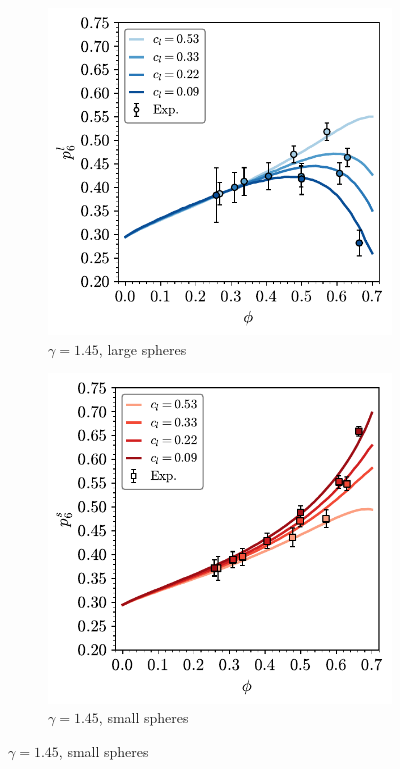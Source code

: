 \begin{figure}[bt]
     \vspace{2mm}
      \begin{subfigure}[b]{0.45\textwidth}
         \centering
         \includegraphics[width=\textwidth]{./figures/quasi2d/bi_ssr_l_phi_p6.pdf}
         \caption{$\gamma=1.45$, large spheres}
         \label{fig:bi3}
     \end{subfigure}
     \hfill
     \begin{subfigure}[b]{0.45\textwidth}
         \centering
         \includegraphics[width=\textwidth]{./figures/quasi2d/bi_ssr_s_phi_p6.pdf}
         \caption{$\gamma=1.45$, small spheres}
         \label{fig:bi4}
     \end{subfigure}
     \hfill
    

\end{figure}
